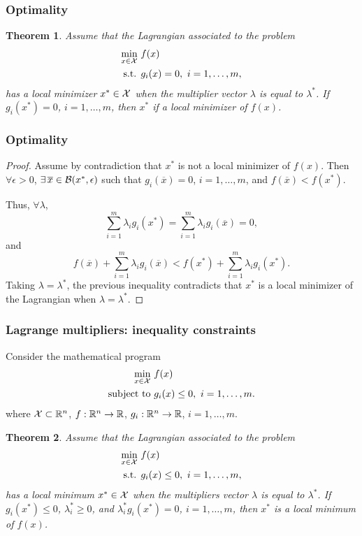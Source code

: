 \documentclass[usepdftitle=false]{beamer}
\newtheorem{thm}{Theorem}
\begin{document}
\begin{frame}
\frametitle{Optimality}

\begin{thm}
Assume that the Lagrangian associated to the problem
\begin{align*}
\min_{x \in {\mathcal{X}}} \ & f(x) \\
\mbox{s.t. } & g_i(x) = 0,\ i = 1,\ldots,m,
\end{align*}
has a local minimizer $x^* \in {\mathcal{X}}$ when the multiplier vector $\lambda$ is equal to $\lambda^*$.
If $g_i(x^*) = 0$, $i = 1,\ldots,m$, then $x^*$ if a local minimizer of $f(x)$.
\end{thm}

\end{frame}

\begin{frame}
\frametitle{Optimality}

\begin{proof}
Assume by contradiction that $x^*$ is not a local minimizer of $f(x)$.
Then $\forall \epsilon > 0$, $\exists\, \overline{x} \in {\mathcal{B}}(x^*, \epsilon)$ such that $g_i(\overline{x}) = 0$, $i = 1,\ldots,m$, and $f(\overline{x}) < f(x^*)$.
	
Thus, $\forall \lambda$,
	$$
	\sum_{i = 1}^{m} \lambda_i g_i(x^*) = \sum_{i = 1}^{m} \lambda_i g_i(\overline{x}) = 0,
	$$
and
$$
f(\overline{x}) + \sum_{i = 1}^{m} \lambda_i g_i(\overline{x}) < f(x^*) + \sum_{i = 1}^{m} \lambda_i g_i(x^*).
$$
Taking $\lambda = \lambda^*$, the previous inequality contradicts that $x^*$ is a local minimizer of the Lagrangian when $\lambda = \lambda^*$.
\end{proof}

\end{frame}

\begin{frame}
\frametitle{Lagrange multipliers: inequality constraints}

Consider the mathematical program
\begin{align*}
\min_{x \in {\mathcal{X}}} \ & f(x) \\
\mbox{subject to } & g_i(x) \leq 0,\ i = 1,\ldots,m.
\end{align*}
where ${\mathcal{X}} \subset {\mathbb{R}}^n$, $f: {\mathbb{R}}^n \rightarrow {\mathbb{R}}$, $g_i: {\mathbb{R}}^n \rightarrow {\mathbb{R}}$, $i = 1,\ldots,m$.

\mbox{}

\begin{thm}
Assume that the Lagrangian associated to the problem
\begin{align*}
\min_{x \in {\mathcal{X}}} \ & f(x) \\
\mbox{s.t. } & g_i(x) \leq 0,\ i = 1,\ldots,m,
\end{align*}
has a local minimum $x^* \in {\mathcal{X}}$ when the multipliers vector $\lambda$ is equal to $\lambda^*$.
If $g_i(x^*) \leq 0$, $\lambda^*_i \geq 0$, and $\lambda^*_i g_i(x^*) = 0$, $i = 1,\ldots,m$, then $x^*$ is a local minimum of $f(x)$.
\end{thm}

\end{frame}
\end{document}
